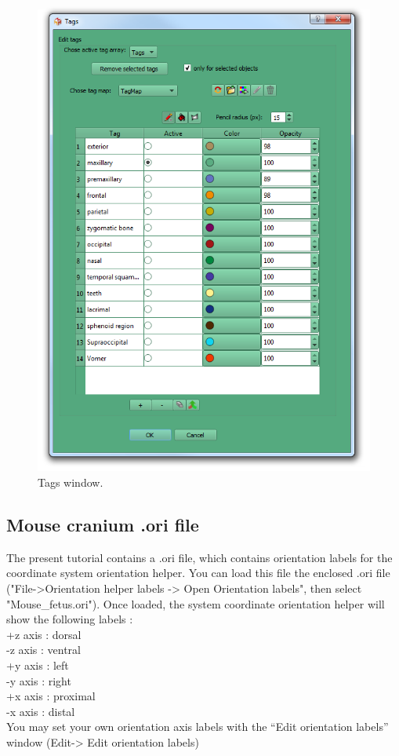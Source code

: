 \documentclass[12pt, a4paper]{book}
\begin{document}
\begin{figure}
  \centering
  \includegraphics[scale=0.5]{tags_window.png}
\caption{Tags window.}	
\label{tags_window}
 \end{figure}


\subsection{Mouse cranium .ori file}
The present tutorial contains a .ori file, which contains orientation labels for the coordinate system
orientation helper. You can load this file the enclosed .ori file ("File->Orientation helper labels -> Open Orientation labels", then select
"Mouse\_fetus.ori"). Once loaded, the system coordinate orientation helper will show the following
labels :\\
+z axis : dorsal\\
-z axis : ventral\\
+y axis : left\\
-y axis : right\\
+x axis : proximal\\
-x axis : distal\\
You may set your own orientation axis labels with the “Edit orientation labels” window (Edit-> Edit orientation labels)
\end{document}
